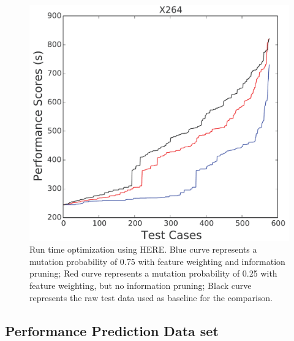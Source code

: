 \documentclass[conference]{IEEEtran}
\begin{document}
{\begin{figure}[htbp!]
\begin{minipage}{0.30\linewidth}
\includegraphics[width=\linewidth]{_figs/X264.pdf}
\end{minipage}
\caption{Run time optimization using HERE. Blue curve represents a mutation probability of 0.75 with feature weighting and information pruning; Red curve represents a mutation probability of 0.25 with feature weighting, but no information pruning; Black curve represents the raw test data used as baseline for the comparison.}
\label{fig:pp}
\end{figure}


\subsection{Performance Prediction Data set}

}
\end{document}
